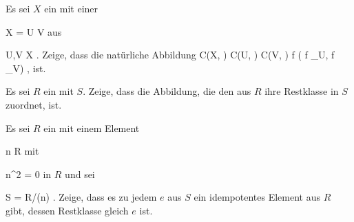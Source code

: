 {}
{





Es sei $X$ ein
mit einer

\mavergleichskettedisp
{\vergleichskette
{X
}
{ =} { U \uplus V
}
{ } {
}
{ } {
}
{ } {
}
}
{}{}{}
aus

\mavergleichskette
{\vergleichskette
{U,V
}
{ \subseteq }{ X
}
{  }{
}
{    }{
}
{   }{
}
}
{}{}{.}
Zeige, dass die natürliche Abbildung
\maabbeledisp {} {C(X, \R) } { C(U, \R)  \times C(V, \R)
} { f } { ( f \vert_U, f \vert_V)
} {,}
ist.





}
{} {}

{}
{





Es sei $R$ ein
mit
$S$. Zeige, dass die Abbildung, die den
aus $R$ ihre Restklasse in $S$ zuordnet,
ist.





}
{} {}

{}
{





Es sei $R$ ein
mit einem Element

\mavergleichskette
{\vergleichskette
{ n
}
{ \in }{ R
}
{  }{
}
{    }{
}
{   }{
}
}
{}{}{}
mit

\mavergleichskette
{\vergleichskette
{ n^2
}
{ = }{ 0
}
{  }{
}
{    }{
}
{   }{
}
}
{}{}{}
in $R$ und sei

\mavergleichskettedisp
{\vergleichskette
{ S
}
{ =} { R/(n)
}
{ } {
}
{ } {
}
{ } {
}
}
{}{}{.}
Zeige, dass es zu jedem
$e$ aus $S$ ein idempotentes Element aus $R$ gibt, dessen Restklasse gleich $e$ ist.





}
{} {}

